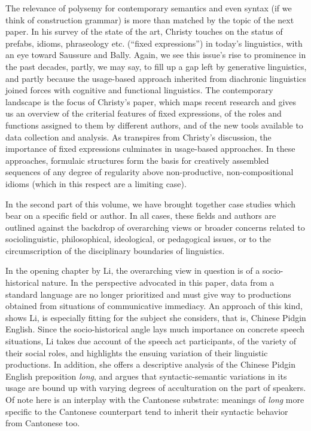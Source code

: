 \documentclass[output=paper]{langsci/langscibook}
\begin{document}
The relevance of polysemy for contemporary semantics and even syntax (if we think of construction grammar) is more than matched by the topic of the next paper. In his survey of the state of the art, Christy touches on the status of prefabs, idioms, phraseology etc. (``fixed expressions'') in today's linguistics, with an eye toward Saussure and Bally. Again, we see this issue's rise to prominence in the past decades, partly, we may say, to fill up a gap left by generative linguistics, and partly because the usage-based approach inherited from diachronic linguistics joined forces with cognitive and functional linguistics. The contemporary landscape is the focus of Christy's paper, which maps recent research and gives us an overview of the criterial features of fixed expressions, of the roles and functions assigned to them by different authors, and of the new tools available to data collection and analysis. As transpires from Christy's discussion, the importance of fixed expressions culminates in usage-based approaches. In these approaches, formulaic structures form the basis for creatively assembled sequences of any degree of regularity above non-productive, non-compositional idioms (which in this respect are a limiting case).

In the second part of this volume, we have brought together case studies which bear on a specific field or author. In all cases, these fields and authors are outlined against the backdrop of overarching views or broader concerns related to sociolinguistic, philosophical, ideological, or pedagogical issues, or to the circumscription of the disciplinary boundaries of linguistics.

In the opening chapter by Li, the overarching view in question is of a socio-historical nature. In the perspective advocated in this paper, data from a standard language are no longer prioritized and must give way to productions obtained from situations of communicative immediacy. An approach of this kind, shows Li, is especially fitting for the subject she considers, that is, Chinese Pidgin English. Since the socio-historical angle lays much importance on concrete speech situations, Li takes due account of the speech act participants, of the variety of their social roles, and highlights the ensuing variation of their linguistic productions. In addition, she offers a descriptive analysis of the Chinese Pidgin English preposition \emph{long}, and argues that syntactic-semantic variations in its usage are bound up with varying degrees of acculturation on the part of speakers. Of note here is an interplay with the Cantonese substrate: meanings of \emph{long} more specific to the Cantonese counterpart tend to inherit their syntactic behavior from Cantonese too. 
\end{document}

